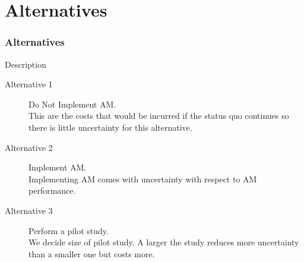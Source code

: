 \documentclass{beamer}
\begin{document}
\section{Alternatives}
\begin{frame}
  \frametitle{Alternatives}
  \begin{block}{Description}
  \begin{description}
  \item[Alternative 1] Do Not Implement AM.\\
    This are the costs that would be incurred if the status quo
    continues so there is little uncertainty for this alternative.
  \item[Alternative 2] Implement AM.\\
    Implementing AM comes with uncertainty with respect to AM
    performance.
  \item [Alternative 3] Perform a pilot study.\\
    We decide size of pilot study.  A larger the study reduces more
    uncertainty than a smaller one but costs more.
  \end{description}
  \end{block}
\end{frame}
\end{document}
